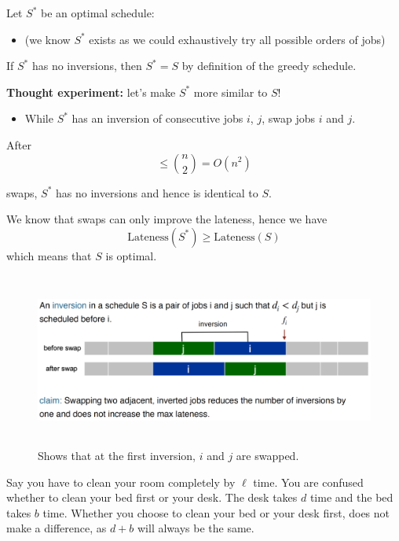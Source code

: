 \newpage

\begin{Proof}
    Let $S^*$ be an optimal schedule:
    \begin{itemize}
        \item (we know $S^*$ exists as we could exhaustively try all possible orders of jobs)
    \end{itemize}
    \noindent
    If $S^*$ has no inversions, then $S^* = S$ by definition of the greedy schedule.
    
    \textbf{Thought experiment:} let’s make $S^*$ more similar to $S$!
    \begin{itemize}
        \item While $S^*$ has an inversion of consecutive jobs $i$, $j$, swap jobs $i$ and $j$.
    \end{itemize}
 
    After 
    \[
    \leq \binom{n}{2} = O(n^2)
    \]

    swaps, $S^*$ has no inversions and hence is identical to $S$.
    
    
    We know that swaps can only improve the lateness, hence we have
    \[
    \text{Lateness}(S^*) \geq \text{Lateness}(S)
    \]
    which means that $S$ is optimal.
    \end{Proof}
    \begin{figure}[h]
        \begin{center}
          \includegraphics[height=2.25in]{./Sections/sched/late/late_proof.png}
        \end{center}
         \caption{Shows that at the first inversion, $i$ and $j$ are swapped.}\label{fig:late_proof}
    \end{figure}
    \begin{Tip}
        Say you have to clean your room completely by $\ell$ time. You are 
        confused whether to clean your bed first or your desk. The desk takes $d$ time and the bed takes $b$ time.
        Whether you choose to clean your bed or your desk first, does not make a difference, as $d+b$ will always be the same.
    \end{Tip}
    

